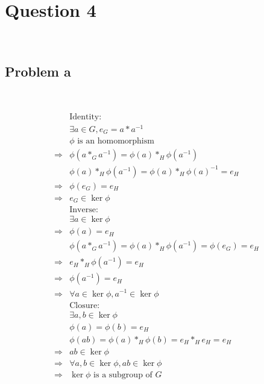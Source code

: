 \documentclass{article}
\begin{document}
\newpage

\section*{Question 4}

~

\subsection*{Problem a}

~

\begin{equation*}
    \begin{split}
        &\text{Identity}:\\
        &\exists a\in G,e_G=a*a^{-1}\\
        &\phi\text{ is an homomorphism}\\
        \Rightarrow&\phi(a*_Ga^{-1})=\phi(a)*_H\phi(a^{-1})\\
        &\phi(a)*_H\phi(a^{-1})=\phi(a)*_H\phi(a)^{-1}=e_H\\
        \Rightarrow&\phi(e_G)=e_H\\
        \Rightarrow&e_G\in\ker\phi\\
        &\text{Inverse}:\\
        &\exists a\in\ker\phi\\
        \Rightarrow&\phi(a)=e_H\\
        &\phi(a*_Ga^{-1})=\phi(a)*_H\phi(a^{-1})=\phi(e_G)=e_H\\
        \Rightarrow&e_H*_H\phi(a^{-1})=e_H\\
        \Rightarrow&\phi(a^{-1})=e_H\\
        \Rightarrow&\forall a\in\ker\phi,a^{-1}\in \ker\phi\\
        &\text{Closure}:\\
        &\exists a,b\in\ker\phi\\
        &\phi(a)=\phi(b)=e_H\\
        &\phi(ab)=\phi(a)*_H\phi(b)=e_H*_He_H=e_H\\
        \Rightarrow&ab \in\ker\phi\\
        \Rightarrow&\forall a,b\in\ker\phi,ab\in\ker\phi\\
        \Rightarrow&\ker\phi\text{ is a subgroup of }G\\
    \end{split}
\end{equation*}

~
\end{document}
